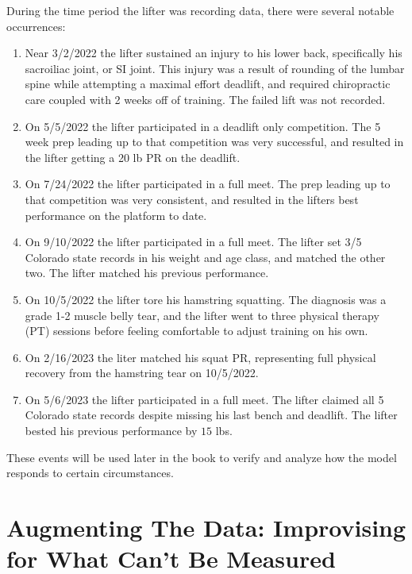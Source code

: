 During the time period the lifter was recording data, there were several notable occurrences:

\begin{enumerate}
    \item Near 3/2/2022 the lifter sustained an injury to his lower back, specifically his sacroiliac joint, or SI joint. This injury was a result of rounding of the lumbar spine while attempting a maximal effort deadlift, and required chiropractic care coupled with 2 weeks off of training. The failed lift was not recorded.
    
    \item On 5/5/2022 the lifter participated in a deadlift only competition. The 5 week prep leading up to that competition was very successful, and resulted in the lifter getting a 20 lb PR on the deadlift.
    
    \item On 7/24/2022 the lifter participated in a full meet. The prep leading up to that competition was very consistent, and resulted in the lifters best performance on the platform to date.
    
   	\item On 9/10/2022 the lifter participated in a full meet. The lifter set 3/5 Colorado state records in his weight and age class, and matched the other two. The lifter matched his previous performance.
    
    \item On 10/5/2022 the lifter tore his hamstring squatting. The diagnosis was a grade 1-2 muscle belly tear, and the lifter went to three physical therapy (PT) sessions before feeling comfortable to adjust training on his own.
    
    \item On 2/16/2023 the liter matched his squat PR, representing full physical recovery from the hamstring tear on 10/5/2022.
    
    \item On 5/6/2023 the lifter participated in a full meet. The lifter claimed all 5 Colorado state records despite missing his last bench and deadlift. The lifter bested his previous performance by $15$ lbs.
\end{enumerate}

These events will be used later in the book to verify and analyze how the model responds to certain circumstances.


\section{Augmenting The Data: Improvising for What Can't Be Measured}
\label{sec:AugmentedDataSet}

